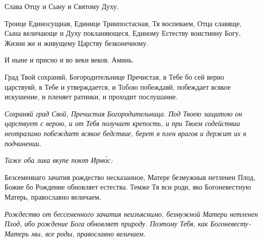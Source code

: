 Слава Отцу и Сыну и Святому Духу.


Троице Единосущная, Единице Триипостасная, Тя воспеваем, Отца славяще, Сына величающе и Духу покланяющеся, Единому Естеству воистинну Богу, Жизни же и живущему Царству безконечному.


И ныне и присно и во веки веков. Аминь.


Град Твой сохраняй, Богородительнице Пречистая, в Тебе бо сей верно царствуяй, в Тебе и утверждается, и Тобою побеждаяй, побеждает всякое искушение, и пленяет ратники, и проходит послушание.


\itshape Сохраняй град Свой, Пречистая Богородительница. Под Твоею защитою он царствует с верою, и от Тебя получает крепость, и при Твоем содействии неотразимо побеждает всякое бедствие, берет в плен врагов и держит их в подчинении.\normalfont{}


\itshape Таже оба лика вкупе поют Ирмо́с:\normalfont{}


Безсеменнаго зачатия рождество несказанное, Матере безмужныя нетленен Плод, Божие бо Рождение обновляет естества. Темже Тя вси роди, яко Богоневестную Матерь, православно величаем.


\itshape Рождество от бессеменного зачатия неизъяснимо, безмужной Матери нетленен Плод, ибо рождение Бога обновляет природу. Поэтому Тебя, как Богоневесту-Матерь мы, все роды, православно величаем.\normalfont{}




\mychapterending